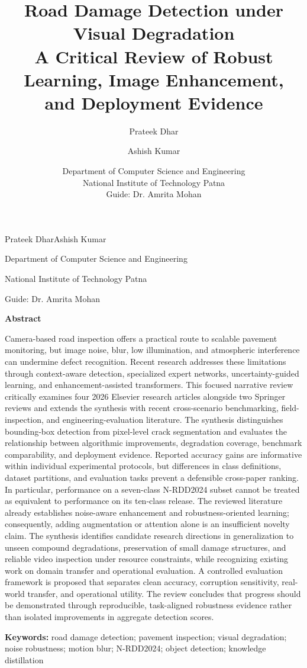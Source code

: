\documentclass[11pt,a4paper]{article}
\title{Road Damage Detection under Visual Degradation\\[3pt]
\large A Critical Review of Robust Learning, Image Enhancement,\\
and Deployment Evidence}
\author{Prateek Dhar \and Ashish Kumar}
\date{\small Department of Computer Science and Engineering\\
National Institute of Technology Patna\\[5pt]
Guide: Dr. Amrita Mohan}
\makeatletter
\renewcommand{\maketitle}{%
  \begin{center}
  {\fontsize{18}{22}\selectfont\bfseries\@title\par}
  \vspace{12pt}
  {\normalsize Prateek Dhar\quad\textbullet\quad Ashish Kumar\par}
  \vspace{5pt}
  {\small Department of Computer Science and Engineering\par
  National Institute of Technology Patna\par}
  \vspace{5pt}
  {\small Guide: Dr. Amrita Mohan\par}
  \end{center}\vspace{5pt}}
\renewenvironment{abstract}{%
  \par\noindent\textbf{Abstract}\par\vspace{4pt}
  \begingroup\small\setlength{\parindent}{0pt}}%
  {\par\endgroup\vspace{7pt}}
\makeatother
\begin{document}
\maketitle

\begin{abstract}

Camera-based road inspection offers a practical route to scalable pavement monitoring, but image noise, blur, low illumination, and atmospheric interference can undermine defect recognition. Recent research addresses these limitations through context-aware detection, specialized expert networks, uncertainty-guided learning, and enhancement-assisted transformers. This focused narrative review critically examines four 2026 Elsevier research articles alongside two Springer reviews and extends the synthesis with recent cross-scenario benchmarking, field-inspection, and engineering-evaluation literature. The synthesis distinguishes bounding-box detection from pixel-level crack segmentation and evaluates the relationship between algorithmic improvements, degradation coverage, benchmark comparability, and deployment evidence. Reported accuracy gains are informative within individual experimental protocols, but differences in class definitions, dataset partitions, and evaluation tasks prevent a defensible cross-paper ranking. In particular, performance on a seven-class N-RDD2024 subset cannot be treated as equivalent to performance on its ten-class release. The reviewed literature already establishes noise-aware enhancement and robustness-oriented learning; consequently, adding augmentation or attention alone is an insufficient novelty claim. The synthesis identifies candidate research directions in generalization to unseen compound degradations, preservation of small damage structures, and reliable video inspection under resource constraints, while recognizing existing work on domain transfer and operational evaluation. A controlled evaluation framework is proposed that separates clean accuracy, corruption sensitivity, real-world transfer, and operational utility. The review concludes that progress should be demonstrated through reproducible, task-aligned robustness evidence rather than isolated improvements in aggregate detection scores.

\end{abstract}
{\small\noindent\textbf{Keywords:} road damage detection; pavement inspection; visual degradation; noise robustness; motion blur; N-RDD2024; object detection; knowledge distillation\par}
\end{document}
